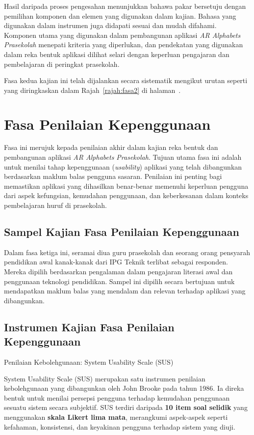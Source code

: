 \begin{itemize}
Hasil daripada proses pengesahan menunjukkan bahawa pakar bersetuju dengan pemilihan komponen dan elemen yang digunakan dalam kajian. Bahasa yang digunakan dalam instrumen juga didapati sesuai dan mudah difahami. Komponen utama yang digunakan dalam pembangunan aplikasi \textit{AR Alphabets Prasekolah} menepati kriteria yang diperlukan, dan pendekatan yang digunakan dalam reka bentuk aplikasi dilihat selari dengan keperluan pengajaran dan pembelajaran di peringkat prasekolah.

Fasa kedua kajian ini telah dijalankan secara sistematik mengikut urutan seperti yang diringkaskan dalam Rajah~\ref{rajah:fasa2} di halaman~\pageref{rajah:fasa2}.
\section{Fasa Penilaian Kepenggunaan}

Fasa ini merujuk kepada penilaian akhir dalam kajian reka bentuk dan pembangunan aplikasi \textit{AR Alphabets Prasekolah}. Tujuan utama fasa ini adalah untuk menilai tahap kepenggunaan (\textit{usability}) aplikasi yang telah dibangunkan berdasarkan maklum balas pengguna sasaran. Penilaian ini penting bagi memastikan aplikasi yang dihasilkan benar-benar memenuhi keperluan pengguna dari aspek kefungsian, kemudahan penggunaan, dan keberkesanan dalam konteks pembelajaran huruf di prasekolah.
\subsection{Sampel Kajian Fasa Penilaian Kepenggunaan}

Dalam fasa ketiga ini, seramai diua  guru prasekolah dan seorang orang pensyarah pendidikan awal kanak-kanak dari IPG  Teknik terlibat sebagai responden. Mereka dipilih berdasarkan pengalaman dalam pengajaran literasi awal dan penggunaan teknologi pendidikan. Sampel ini dipilih secara bertujuan untuk mendapatkan maklum balas yang mendalam dan relevan terhadap aplikasi yang dibangunkan.
\subsection{Instrumen Kajian Fasa Penilaian Kepenggunaan}

 Penilaian Kebolehgunaan: System Usability Scale (SUS)

System Usability Scale (SUS) merupakan satu instrumen penilaian kebolehgunaan yang dibangunkan oleh John Brooke pada tahun 1986. Ia direka bentuk untuk menilai persepsi pengguna terhadap kemudahan penggunaan sesuatu sistem secara subjektif. SUS terdiri daripada \textbf{10 item soal selidik} yang menggunakan \textbf{skala Likert lima mata}, merangkumi aspek-aspek seperti kefahaman, konsistensi, dan keyakinan pengguna terhadap sistem yang diuji.


\end{itemize}
